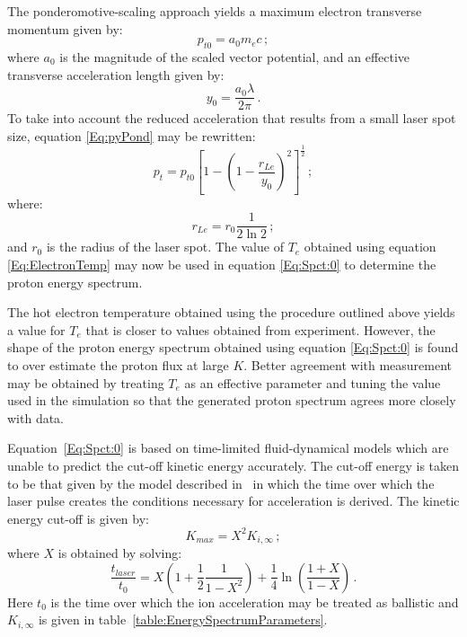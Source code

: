 The ponderomotive-scaling approach yields a maximum electron
transverse momentum given by:
\begin{equation}
  p_{t0} = a_0 m_e c \, ;
  \label{Eq:pyPond}
\end{equation}
where $a_0$ is the magnitude of the scaled vector potential, and an
effective transverse acceleration length given by:
\begin{equation}
  y_0 = \frac{a_0 \lambda}{2\pi} \, .
\end{equation}
To take into account the reduced acceleration that results from a
small laser spot size, equation \ref{Eq:pyPond} may be rewritten:
\begin{equation}
  p_t = p_{t0} \left[
                1 - \left(
                      1 - \frac{r_{Le}}{y_0}
                    \right)^2
              \right]^\frac{1}{2} \, ;
\end{equation}
where:
\begin{equation}
  r_{Le} = r_0 \frac{1}{2 \ln 2} \, ;
\end{equation}
and $r_0$ is the radius of the laser spot.
The value of $T_e$ obtained using equation \ref{Eq:ElectronTemp} may
now be used in equation \ref{Eq:Spct:0} to determine the proton energy
spectrum.

The hot electron temperature obtained using the procedure outlined
above yields a value for $T_e$ that is closer to values obtained from
experiment.
However, the shape of the proton energy spectrum obtained using
equation \ref{Eq:Spct:0} is found to over estimate the proton flux at
large $K$.
Better agreement with measurement may be obtained by treating $T_e$ as
an effective parameter and tuning the value used in the simulation so
that the generated proton spectrum agrees more closely with data.

Equation~\ref{Eq:Spct:0} is based on time-limited fluid-dynamical
models which are unable to predict the cut-off kinetic energy
accurately. 
The cut-off energy is taken to be that given by the model described
in~\cite{10.1103/PhysRevLett.97.045005} in which the time over which
the laser pulse creates the conditions necessary for acceleration is
derived.
The kinetic energy cut-off is given by:
\begin{equation}
  K_{max} = X^{2} K_{i,\infty} \, ;
  \label{eq:Eq:Spct:2}
\end{equation}
where $X$ is obtained by solving:
\begin{equation}
  \frac{t_{laser}}{t_{0}} = X \left( 1 + \frac{1}{2}
                           \frac{1}{1 - X^{2}} \right) +
                           \frac{1}{4} \ln \left( \frac{1+X}{1-X} \right) \, .
  \label{eq:Eq:Spct:1}
\end{equation}
Here $t_0$ is the time over which the ion acceleration may be treated
as ballistic and $K_{i,\infty}$ is given in
table~\ref{table:EnergySpectrumParameters}.

